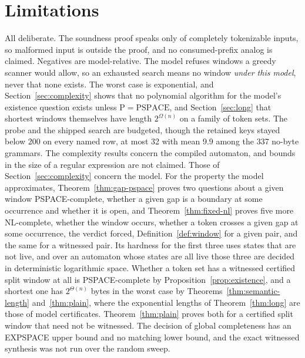 \documentclass[11pt,a4paper]{article}
\theoremstyle{definition}
\theoremstyle{plain}
\begin{document}
\section{Limitations}
\label{sec:limitations}

All deliberate. The soundness proof speaks only of completely tokenizable inputs, so malformed input is outside the
proof, and no consumed-prefix analog is claimed. Negatives are model-relative. The model refuses windows a greedy
scanner would allow, so an exhausted search means no window \emph{under this model}, never that none exists. The worst
case is exponential, and Section~\ref{sec:complexity} shows that no polynomial algorithm for the model's existence
question exists unless $\mathrm{P} = \mathrm{PSPACE}$, and Section~\ref{sec:long} that shortest windows themselves have
length $2^{\Omega(n)}$ on a family of token sets. The probe and the shipped search are budgeted, though the retained
keys stayed below 200 on every named row, at most 32 with mean 9.9 among the 337 no-byte grammars. The complexity
results concern the compiled automaton, and bounds in the size of a regular expression are not claimed. Those of
Section~\ref{sec:complexity} concern the model. For the property the model approximates, Theorem~\ref{thm:gap-pspace}
proves two questions about a given window PSPACE-complete, whether a given gap is a boundary at some occurrence and
whether it is open, and Theorem~\ref{thm:fixed-nl} proves five more NL-complete, whether the window occurs, whether a
token crosses a given gap at some occurrence, the verdict forced, Definition~\ref{def:window} for a given pair, and the
same for a witnessed pair. Its hardness for the first three uses states that are not live, and over an automaton whose
states are all live those three are decided in deterministic logarithmic space. Whether a token set has a witnessed
certified split window at all is PSPACE-complete by Proposition~\ref{prop:existence}, and a shortest one has
$2^{\Theta(n)}$ bytes in the worst case by Theorems~\ref{thm:semantic-length} and~\ref{thm:plain}, where the exponential
lengths of Theorem~\ref{thm:long} are those of model certificates. Theorem~\ref{thm:plain} proves both for a certified
split window that need not be witnessed. The decision of global completeness has an EXPSPACE upper bound and no matching
lower bound, and the exact witnessed synthesis was not run over the random sweep.
\end{document}
